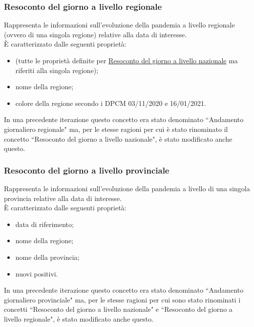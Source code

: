 \subsubsection{Resoconto del giorno a livello regionale}
\label{sss:resoconto-del-giorno-livello-regionale}
Rappresenta le informazioni sull'evoluzione della pandemia a livello regionale (ovvero di una singola regione) relative alla data di interesse.\\
È caratterizzato dalle seguenti proprietà:
\begin{itemize}
    \item (tutte le proprietà definite per \hyperref[sss:resoconto-del-giorno-livello-nazionale]{Resoconto del giorno a livello nazionale} ma riferiti alla singola regione);
    \item nome della regione;
    \item colore della regione secondo i DPCM 03/11/2020 e 16/01/2021.
\end{itemize}
In una precedente iterazione questo concetto era stato denominato ``Andamento giornaliero regionale" ma, per le stesse ragioni per cui è stato rinominato il concetto ``Resoconto del giorno a livello nazionale", è stato modificato anche questo.

\subsubsection{Resoconto del giorno a livello provinciale}
\label{sss:resoconto-del-giorno-livello-provinciale}
Rappresenta le informazioni sull'evoluzione della pandemia a livello di una singola provincia relative alla data di interesse.\\
È caratterizzato dalle seguenti proprietà:
\begin{itemize}
    \item data di riferimento;
    \item nome della regione;
    \item nome della provincia;
    \item nuovi positivi.
\end{itemize}
In una precedente iterazione questo concetto era stato denominato ``Andamento giornaliero provinciale" ma, per le stesse ragioni per cui sono stato rinominati i concetti ``Resoconto del giorno a livello nazionale" e ``Resoconto del giorno a livello regionale", è stato modificato anche questo.

